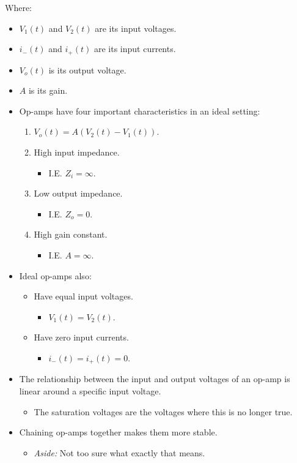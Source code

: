 \documentclass{article}
\begin{document}
\vspace{1em}

Where:

\begin{itemize}
	\item $V_1(t)$ and $V_2(t)$ are its input voltages.
	\item $i_-(t)$ and $i_+(t)$ are its input currents.
	\item $V_o(t)$ is its output voltage.
	\item $A$ is its gain.
\end{itemize}

\vspace{.5em}

\begin{itemize}
	\item Op-amps have four important characteristics in an ideal setting:
	\begin{enumerate}
		\item $V_o(t) = A(V_2(t) - V_1(t))$.
		\item High input impedance.
		\begin{itemize}
			\item I.E. $Z_i = \infty$.
		\end{itemize}
		\item Low output impedance.
		\begin{itemize}
			\item I.E. $Z_o = 0$.
		\end{itemize}
		\item High gain constant.
		\begin{itemize}
			\item I.E. $A = \infty$.
		\end{itemize}
	\end{enumerate}
	\item Ideal op-amps also:
	\begin{itemize}
		\item Have equal input voltages.
		\begin{itemize}
			\item $V_1(t) = V_2(t)$.
		\end{itemize}
		\item Have zero input currents.
		\begin{itemize}
			\item $i_-(t) = i_+(t) = 0$.
		\end{itemize}
	\end{itemize}
	\item The relationship between the input and output voltages of an op-amp is linear around a specific input voltage.
	\begin{itemize}
		\item The saturation voltages are the voltages where this is no longer true.
	\end{itemize}
	\item Chaining op-amps together makes them more stable.
	\begin{itemize}
		\item \emph{Aside:} Not too sure what exactly that means.
	\end{itemize}
\end{itemize}

\ifdefined\iscombined
	\newpage
\else
	
\end{document}
